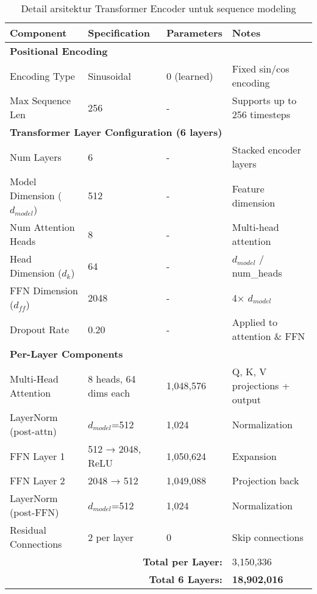 \documentclass[12pt,a4paper]{article}
\begin{document}
\begin{table}[H]
\centering
\caption{Detail arsitektur Transformer Encoder untuk sequence modeling}
\label{tab:appendix-transformer-detailed}
\small
\begin{tabular}{|l|l|l|l|}
\hline
\textbf{Component} & \textbf{Specification} & \textbf{Parameters} & \textbf{Notes} \\ \hline
\multicolumn{4}{|l|}{\textbf{Positional Encoding}} \\ \hline
Encoding Type & Sinusoidal & 0 (learned) & Fixed sin/cos encoding \\ \hline
Max Sequence Len & 256 & - & Supports up to 256 timesteps \\ \hline
\multicolumn{4}{|l|}{\textbf{Transformer Layer Configuration (6 layers)}} \\ \hline
Num Layers & 6 & - & Stacked encoder layers \\ \hline
Model Dimension ($d_{model}$) & 512 & - & Feature dimension \\ \hline
Num Attention Heads & 8 & - & Multi-head attention \\ \hline
Head Dimension ($d_k$) & 64 & - & $d_{model}$ / num\_heads \\ \hline
FFN Dimension ($d_{ff}$) & 2048 & - & 4× $d_{model}$ \\ \hline
Dropout Rate & 0.20 & - & Applied to attention \& FFN \\ \hline
\multicolumn{4}{|l|}{\textbf{Per-Layer Components}} \\ \hline
Multi-Head Attention & 8 heads, 64 dims each & 1,048,576 & Q, K, V projections + output \\ \hline
LayerNorm (post-attn) & $d_{model}$=512 & 1,024 & Normalization \\ \hline
FFN Layer 1 & 512 → 2048, ReLU & 1,050,624 & Expansion \\ \hline
FFN Layer 2 & 2048 → 512 & 1,049,088 & Projection back \\ \hline
LayerNorm (post-FFN) & $d_{model}$=512 & 1,024 & Normalization \\ \hline
Residual Connections & 2 per layer & 0 & Skip connections \\ \hline
\multicolumn{3}{|r|}{\textbf{Total per Layer:}} & 3,150,336 \\ \hline
\multicolumn{3}{|r|}{\textbf{Total 6 Layers:}} & \textbf{18,902,016} \\ \hline
\end{tabular}
\end{table}
\end{document}

